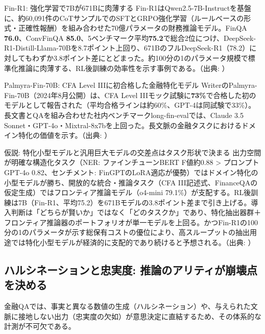 \begin{casestudy}{Fin-R1: 強化学習で7Bが671Bに肉薄する}
Fin-R1はQwen2.5-7B-Instructを基盤に、約60,091件のCoTサンプルでのSFTとGRPO強化学習（ルールベースの形式・正確性報酬）を組み合わせた70億パラメータの財務推論モデル。FinQA \textbf{76.0}、ConvFinQA \textbf{85.0}、5ベンチマーク平均\textbf{75.2}で総合2位につけ、DeepSeek-R1-Distill-Llama-70Bを8.7ポイント上回り、671BのフルDeepSeek-R1（78.2）に対してもわずか3.8ポイント差にとどまった。約100分の1のパラメータ規模で標準化推論に肉薄する、RL後訓練の効率性を示す事例である。（出典: \cite{x05finr1_2025}）
\end{casestudy}

\begin{casestudy}{Palmyra-Fin-70B: CFA Level IIIに初合格した金融特化モデル}
WriterのPalmyra-Fin-70B（2024年8月公開）は、CFA Level IIIモック試験に\textbf{73\%}で合格した初のモデルとして報告された（平均合格ラインは約60\%、GPT-4は同試験で33\%）。長文書とQAを組み合わせた社内ベンチマークlong-fin-evalでは、Claude 3.5 Sonnet・GPT-4o・Mixtral-8x7bを上回った。長文脈の金融タスクにおけるドメイン特化の価値を示す。（出典: \cite{x05palmyrafin2024}）
\end{casestudy}

\begin{insight}{仮説: 特化小型モデルと汎用巨大モデルの交差点はタスク形状で決まる}
出力空間が明確な構造化タスク（NER: ファインチューンBERT F値約0.88 > プロンプトGPT-4o 0.82、センチメント: FinGPTのLoRA適応が優勢）ではドメイン特化の小型モデルが勝ち、開放的な統合・推論タスク（CFA III記述式、FinanceQAの仮定生成）ではフロンティア推論モデル（o4-mini 79.1\%）が支配する。RL後訓練は7B（Fin-R1、平均75.2）を671Bモデルの3.8ポイント差まで引き上げる。導入判断は「どちらが賢いか」ではなく「どのタスクか」であり、特化抽出器群＋フロンティア推論器のポートフォリオが単一モデルを上回る。かつFin-R1の100分の1のパラメータが示す総保有コストの優位により、高スループットの抽出用途では特化小型モデルが経済的に支配的であり続けると予想される。（出典: \cite{x05finr1_2025,x05finerord2025,x05fingpt2023,x05cfa3eval2025,x05palmyrafin2024}）
\end{insight}

\subsection{ハルシネーションと忠実度: 推論のアリティが崩壊点を決める}

金融QAでは、事実と異なる数値の生成（ハルシネーション）や、与えられた文脈に接地しない出力（忠実度の欠如）が意思決定に直結するため、その体系的な計測が不可欠である。

